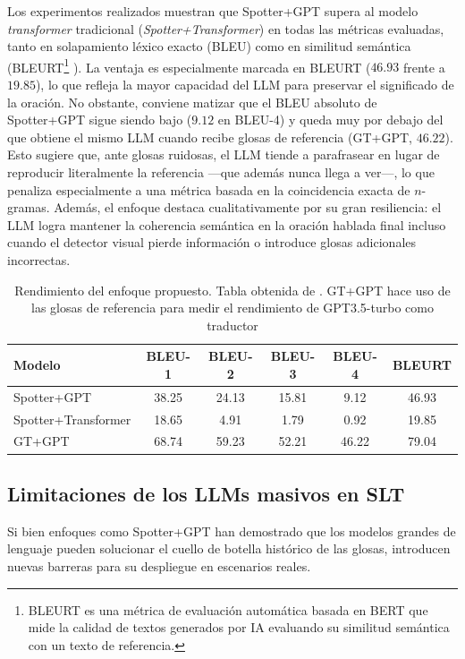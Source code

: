 Los experimentos realizados muestran que Spotter+GPT supera al modelo \textit{transformer} tradicional (\textit{Spotter+Transformer}) en todas las métricas evaluadas, tanto en solapamiento léxico exacto (BLEU) como en similitud semántica (BLEURT\footnote{BLEURT es una métrica de evaluación automática basada en BERT que mide la calidad de textos generados por IA evaluando su similitud semántica con un texto de referencia.} \cite{BLEURT}).
La ventaja es especialmente marcada en BLEURT ($46.93$ frente a $19.85$), lo que refleja la mayor capacidad del LLM para preservar el significado de la oración.
No obstante, conviene matizar que el BLEU absoluto de Spotter+GPT sigue siendo bajo ($9.12$ en BLEU-4) y queda muy por debajo del que obtiene el mismo LLM cuando recibe glosas de referencia (GT+GPT, $46.22$).
Esto sugiere que, ante glosas ruidosas, el LLM tiende a parafrasear en lugar de reproducir literalmente la referencia —que además nunca llega a ver—, lo que penaliza especialmente a una métrica basada en la coincidencia exacta de $n$-gramas.
Además, el enfoque destaca cualitativamente por su gran resiliencia: el LLM logra mantener la coherencia semántica en la oración hablada final incluso cuando el detector visual pierde información o introduce glosas adicionales incorrectas.

\begin{table}[htbp]
    \centering
    \begin{tabular}{lccccc}
        \toprule
        \textbf{Modelo} & \textbf{BLEU-1} & \textbf{BLEU-2} & \textbf{BLEU-3} & \textbf{BLEU-4} & \textbf{BLEURT} \\
        \midrule
        Spotter+GPT         & 38.25 & 24.13 & 15.81 & 9.12 & 46.93 \\
        Spotter+Transformer & 18.65 & 4.91  & 1.79  & 0.92 & 19.85 \\
        GT+GPT              & 68.74 & 59.23 & 52.21 & 46.22 & 79.04 \\
        \bottomrule
    \end{tabular}
    \caption{Rendimiento del enfoque propuesto. Tabla obtenida de \cite{SpotterGPT}. GT+GPT hace uso de las glosas de referencia para medir el rendimiento de GPT3.5-turbo como traductor}
\label{tab:resultados_dgs20}
\end{table}

\subsection{Limitaciones de los LLMs masivos en SLT}
Si bien enfoques como Spotter+GPT han demostrado que los modelos grandes de lenguaje pueden solucionar el cuello de botella histórico de las glosas, introducen nuevas barreras para su despliegue en escenarios reales.

